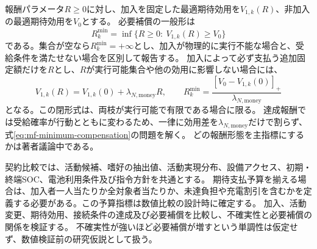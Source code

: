 報酬パラメータ$R\ge0$に対し、加入を固定した最適期待効用を$V_{1,k}(R)$、非加入の最適期待効用を$V_0$とする。
必要補償の一般形は
\begin{equation}
 R_k^{\min}=\inf\{R\ge0:\ V_{1,k}(R)\ge V_0\}
 \label{eq:mf-minimum-compensation}
\end{equation}
である。集合が空なら$R_k^{\min}=+\infty$とし、加入が物理的に実行不能な場合と、受給条件を満たせない場合を区別して報告する。
加入によって必ず支払う追加固定額だけを$R$とし、$R$が実行可能集合や他の効用に影響しない場合には、
\begin{equation}
 V_{1,k}(R)=V_{1,k}(0)+\lambda_{N,\mathrm{money}}R,
 \qquad R_k^{\min}
 =\frac{[V_0-V_{1,k}(0)]_+}{\lambda_{N,\mathrm{money}}}
 \label{eq:mf-fixed-compensation}
\end{equation}
となる。この閉形式は、両枝が実行可能で有限である場合に限る。
達成報酬では受給確率が行動とともに変わるため、一律に効用差を$\lambda_{N,\mathrm{money}}$だけで割らず、式\eqref{eq:mf-minimum-compensation}の問題を解く。
どの報酬形態を主指標にするかは著者議論中である。

契約比較では、活動候補、嗜好の抽出値、活動実現分布、設備アクセス、初期・終端SOC、電池利用条件及び指令方針を共通とする。
期待支払予算を揃える場合は、加入者一人当たりか全対象者当たりか、未達負担や充電割引を含むかを定義する必要がある。この予算指標は数値比較の設計時に確定する。
加入、活動変更、期待効用、接続条件の達成及び必要補償を比較し、不確実性と必要補償の関係を検証する。
不確実性が強いほど必要補償が増すという単調性は仮定せず、数値検証前の研究仮説として扱う。
